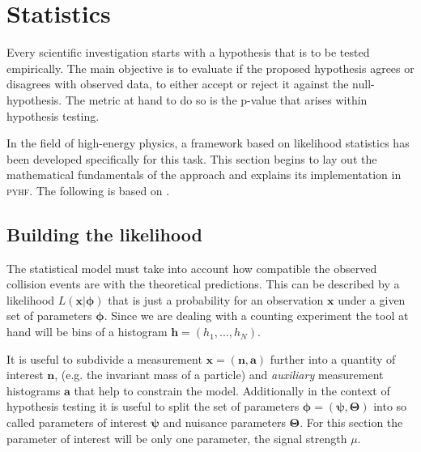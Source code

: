 \section{Statistics}\label{sec:statistics}

Every scientific investigation starts with a hypothesis that is to be tested empirically. The main objective is to evaluate if the proposed hypothesis agrees or disagrees with observed data, to either accept or reject it against the null-hypothesis. The metric at hand to do so is the p-value that arises within hypothesis testing. 

In the field of high-energy physics, a framework based on likelihood statistics has been developed specifically for this task. This section begins to lay out the mathematical fundamentals of the approach and explains its implementation in \textsc{pyhf}. The following is based on \citep{cowan2011asymptotic,behnke2013data,pyhf_intro}.

\subsection{Building the likelihood}
The statistical model must take into account how compatible the observed collision events are with the theoretical predictions. This can be described by a likelihood $L(\bm{x} | \bm{\phi})$ that is just a probability for an observation $\bm{x}$ under a given set of parameters $\bm{\phi}$. Since we are dealing with a counting experiment the tool at hand will be bins of a histogram $\bm{h}=(h_1,...,h_N)$. 

It is useful to subdivide a measurement $\bm{x}=(\bm{n},\bm{a})$ further into a quantity of interest $\bm{n}$, (e.g. the invariant mass of a particle) and \textit{auxiliary} measurement histograms $\bm{a}$ that help to constrain the model. Additionally in the context of hypothesis testing it is useful to split the set of parameters $\bm{\phi}=(\bm{\psi},\bm{\Theta})$ into so called parameters of interest $\bm{\psi}$ and nuisance parameters $\bm{\Theta}$. For this section the parameter of interest will be only one parameter, the signal strength $\mu$. 

